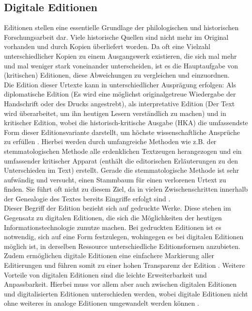 \documentclass[12pt,a4paper]{article}
\begin{document}
	\subsection{Digitale Editionen}
		Editionen stellen eine essentielle Grundlage der philologischen und historischen Forschungsarbeit dar. 
		Viele historische Quellen sind nicht mehr im Original vorhanden und durch Kopien überliefert worden. 
		Da oft eine Vielzahl unterschiedlicher Kopien zu einem Ausgangswerk existieren, die sich mal mehr und mal weniger stark voneinander unterscheiden, 
		ist es die Hauptaufgabe von (kritischen) Editionen, diese Abweichungen zu vergleichen und einzuordnen. \\
		Die Edition dieser Urtexte kann in unterschiedlicher Ausprägung erfolgen: Als diplomatische Edition 
		(Es wird eine möglichst originalgetreue Wiedergabe der Handschrift oder des Drucks angestrebt), als interpretative Edition (Der Text wird überarbeitet, 
		um ihn heutigen Lesern verständlich zu machen) und in kritischer Edition, wobei die historisch-kritische Ausgabe (HKA) die umfassendste Form dieser 
		Editionsvariante darstellt, um höchste wissenschaftliche Ansprüche zu erfüllen \parencite[S.~236]{SahlDigi2013a}. Hierbei werden durch umfangreiche Methoden wie z.B. 
		der stemmatologischen Methode alle erdenklichen Textzeugen herangezogen und ein umfassender kritischer Apparat (enthält die editorischen Erläuterungen 
		zu den Unterschieden im Text) erstellt. Gerade die stemmatologische Methode ist sehr aufwändig und versucht, einen Stammbaum für einen verlorenen Urtext 
		zu finden. Sie führt oft nicht zu diesem Ziel, da in vielen Zwischenschritten innerhalb der Genealogie des Textes bereits Eingriffe erfolgt sind \parencite[S.~115]{SahlDigi2013a}.\\
		Dieser Begriff der Edition bezieht sich auf gedruckte Werke. Diese stehen im Gegensatz zu digitalen Editionen, die sich die Möglichkeiten der heutigen 
		Informationstechnologie zunutze machen. Bei gedruckten Editionen ist es notwendig, sich auf eine Form festzulegen, wohingegen es bei digitalen Editionen möglich ist, 
		in derselben Ressource unterschiedliche Editionsformen anzubieten. Zudem ermöglichen digitale Editionen eine einfachere Markierung aller Editierungen und führen somit 
		zu einer hohen Transparenz der Edition \parencite[S.~131]{SahlDigi2013b}.  
		Weitere Vorteile von digitalen Editionen sind die leichte Erweiterbarkeit und Anpassbarkeit. Hierbei muss vor allem aber auch zwischen digitalen Editionen und 
		digitalisierten Editionen unterschieden werden, wobei digitale Editionen nicht ohne weiteres in analoge Editionen umgewandelt werden können \parencite[S.~27]{sahle2016}.
	
\end{document}
